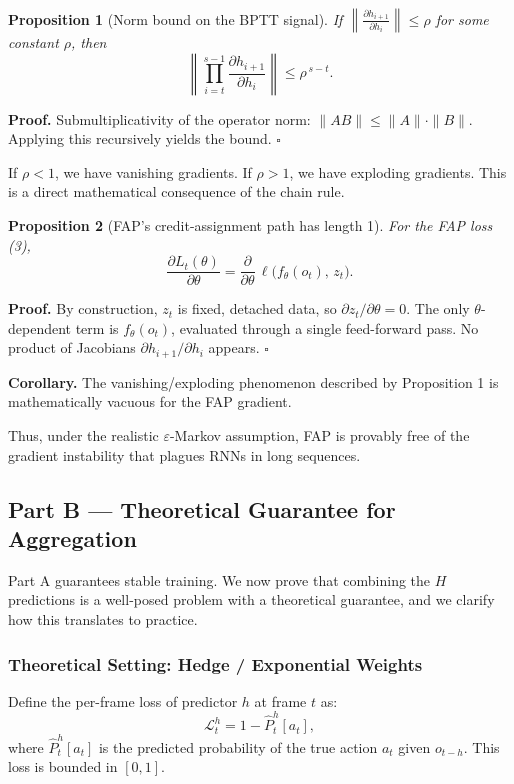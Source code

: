 \documentclass[11pt]{article}
\newtheorem{proposition}{Proposition}
\begin{document}
\begin{proposition}[Norm bound on the BPTT signal]
If \(\left\| \frac{\partial h_{i+1}}{\partial h_i} \right\| \le \rho\) for some constant \(\rho\), then
\[
\left\| \prod_{i=t}^{s-1} \frac{\partial h_{i+1}}{\partial h_i} \right\|
\le
\rho^{\,s-t}. \tag{5}
\]
\end{proposition}
\textbf{Proof.} Submultiplicativity of the operator norm: \(\|AB\| \le \|A\|\cdot\|B\|\). Applying this recursively yields the bound. \(\square\)

If \(\rho < 1\), we have vanishing gradients. If \(\rho > 1\), we have exploding gradients. This is a direct mathematical consequence of the chain rule.

\begin{proposition}[FAP's credit-assignment path has length 1]
For the FAP loss (3),
\[
\frac{\partial L_t(\theta)}{\partial \theta}
=
\frac{\partial}{\partial \theta}\, \ell\bigl(f_\theta(o_t),\, z_t\bigr). \tag{6}
\]
\end{proposition}
\textbf{Proof.} By construction, \(z_t\) is fixed, detached data, so \(\partial z_t / \partial \theta = 0\). The only \(\theta\)-dependent term is \(f_\theta(o_t)\), evaluated through a single feed-forward pass. No product of Jacobians \(\partial h_{i+1}/\partial h_i\) appears. \(\square\)

\textbf{Corollary.} The vanishing/exploding phenomenon described by Proposition 1 is mathematically vacuous for the FAP gradient.

Thus, under the realistic \(\varepsilon\)-Markov assumption, FAP is provably free of the gradient instability that plagues RNNs in long sequences.

\subsection{Part B — Theoretical Guarantee for Aggregation}

Part A guarantees stable training. We now prove that combining the \(H\) predictions is a well-posed problem with a theoretical guarantee, and we clarify how this translates to practice.

\subsubsection{Theoretical Setting: Hedge / Exponential Weights}

Define the per-frame loss of predictor \(h\) at frame \(t\) as:
\[
\mathcal{L}^h_t = 1 - \hat{P}^h_t[a_t], \tag{7}
\]
where \(\hat{P}^h_t[a_t]\) is the predicted probability of the true action \(a_t\) given \(o_{t-h}\). This loss is bounded in \([0,1]\).
\end{document}
